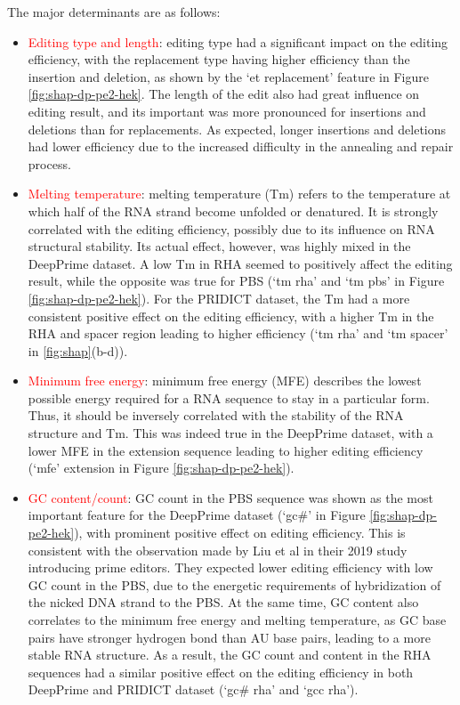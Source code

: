 The major determinants are as follows:
\begin{itemize}[itemsep=-0mm]
    \item \textcolor{red}{Editing type and length}: editing type had a significant impact on the editing efficiency, with the replacement type having higher efficiency than the insertion and deletion, as shown by the `et replacement' feature in Figure \ref{fig:shap-dp-pe2-hek}. The length of the edit also had great influence on editing result, and its important was more pronounced for insertions and deletions than for replacements. As expected, longer insertions and deletions had lower efficiency due to the increased difficulty in the annealing and repair process.
    \item \textcolor{red}{Melting temperature}: melting temperature (Tm) refers to the temperature at which half of the RNA strand become unfolded or denatured. It is strongly correlated with the editing efficiency, possibly due to its influence on RNA structural stability. Its actual effect, however, was highly mixed in the DeepPrime dataset. A low Tm in RHA seemed to positively affect the editing result, while the opposite was true for PBS (`tm rha' and `tm pbs' in Figure \ref{fig:shap-dp-pe2-hek}). For the PRIDICT dataset, the Tm had a more consistent positive effect on the editing efficiency, with a higher Tm in the RHA and spacer region leading to higher efficiency (`tm rha' and `tm spacer' in \autoref{fig:shap}(b-d)).
    \item \textcolor{red}{Minimum free energy}: minimum free energy (MFE) describes the lowest possible energy required for a RNA sequence to stay in a particular form\cite{lorenzViennaRNAPackage2011}. Thus, it should be inversely correlated with the stability of the RNA structure and Tm. This was indeed true in the DeepPrime dataset, with a lower MFE in the extension sequence leading to higher editing efficiency (`mfe' extension in Figure \ref{fig:shap-dp-pe2-hek}). 
    \item \textcolor{red}{GC content/count}: GC count in the PBS sequence was shown as the most important feature for the DeepPrime dataset (`gc\#' in Figure \ref{fig:shap-dp-pe2-hek}), with prominent positive effect on editing efficiency. This is consistent with the observation made by Liu et al in their 2019 study introducing prime editors\cite{liudavidr.SearchandreplaceGenomeEditing2019}. They expected lower editing efficiency with low GC count in the PBS, due to the energetic requirements of hybridization of the nicked DNA strand to the PBS. At the same time, GC content also correlates to the minimum free energy and melting temperature, as GC base pairs have stronger hydrogen bond than AU base pairs, leading to a more stable RNA structure\cite{kimPredictingEfficiencyPrime2021}. As a result, the GC count and content in the RHA sequences had a similar positive effect on the editing efficiency in both DeepPrime and PRIDICT dataset (`gc\# rha' and `gcc rha'). 

\end{itemize}
